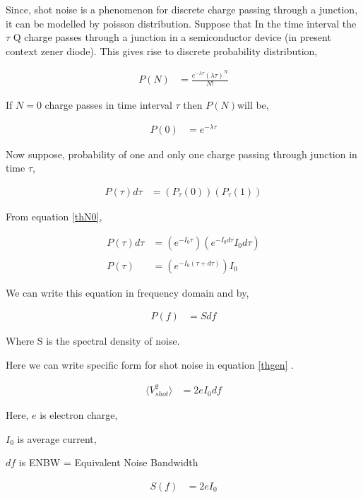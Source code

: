 \documentclass[12pt]{article}
\begin{document}
Since, shot noise is a phenomenon for discrete charge passing through a junction, it can be modelled by poisson distribution. Suppose that In the time interval the $\tau$ Q charge passes through a junction in a semiconductor device (in present context zener diode). This gives rise to discrete probability distribution,

\begin{align}
P(N) & = \frac{e^{-\lambda \tau}(\lambda \tau)^{N}}{N!}
\end{align}

If $N=0$ charge passes in time interval $\tau$ then $P(N)$will be,

\begin{align} \label{eqN0}
P(0) & = e^{-\lambda \tau}
\end{align}

Now suppose, probability of one and only one charge passing through junction in time $\tau$,

\begin{align*}
P(\tau)d\tau & = (P_{\tau}(0))(P_{\tau}(1))
\end{align*}

From equation \ref{thN0},


\begin{align*}
P(\tau)d\tau & = (e^{-I_0 \tau})(e^{-I_0 d\tau} I_0 d\tau)\\
\\  
P(\tau) & = (e^{-I_0 (\tau + d\tau)}) I_0
\end{align*}

We can write this equation in frequency domain and by,

\begin{align}\label{thgenl}
P(f) & = S df
\end{align}

Where S is the spectral density of noise.

Here we can write specific form for shot noise in equation \ref{thgen} \cite{campbell}.

\begin{align}\label{thshotvo}
\langle V_{shot}^2\rangle & = 2 e I_0 df
\end{align}

Here, $e$ is electron charge,

$I_0$ is average current,

$df$ is ENBW = Equivalent Noise Bandwidth

\begin{align}\label{thshots}
S(f) & = 2 e I_0
\end{align}
\end{document}
